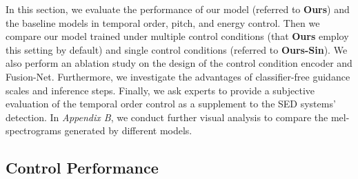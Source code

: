 \documentclass[letterpaper]{article} %
\begin{document}
In this section, we evaluate the performance of our model (referred to \textbf{Ours}) and the baseline models in temporal order, pitch, and energy control. Then we compare our model trained under multiple control conditions (that \textbf{Ours} employ this setting by default) and single control conditions (referred to \textbf{Ours-Sin}). We also perform an ablation study on the design of the control condition encoder and Fusion-Net. Furthermore, we investigate the advantages of classifier-free guidance scales and inference steps. Finally, we ask experts to provide a subjective evaluation of the temporal order control as a supplement to the SED systems' detection. In \textit{Appendix B}, we conduct further visual analysis to compare the mel-spectrograms generated by different models.

\subsection{Control Performance}

\begin{table}[!h]\footnotesize
    \centering
    \caption{The control performance between Ours and baseline models. ``GT'' stands for the ground-truth recordings.}
    \label{tab:control}
\end{table}
\end{document}
